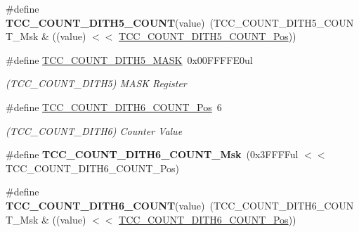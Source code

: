 \begin{DoxyCompactItemize}
\item 
\hypertarget{group___s_a_m_l21___t_c_c_gabfa5a63bca2722f40f33efadca27b212}{}\#define {\bfseries T\+C\+C\+\_\+\+C\+O\+U\+N\+T\+\_\+\+D\+I\+T\+H5\+\_\+\+C\+O\+U\+N\+T}(value)~(T\+C\+C\+\_\+\+C\+O\+U\+N\+T\+\_\+\+D\+I\+T\+H5\+\_\+\+C\+O\+U\+N\+T\+\_\+\+Msk \& ((value) $<$$<$ \hyperlink{group___s_a_m_l21___t_c_c_ga6f2bca760853e6c3d56aac5d8ec21bcf}{T\+C\+C\+\_\+\+C\+O\+U\+N\+T\+\_\+\+D\+I\+T\+H5\+\_\+\+C\+O\+U\+N\+T\+\_\+\+Pos}))\label{group___s_a_m_l21___t_c_c_gabfa5a63bca2722f40f33efadca27b212}

\item 
\hypertarget{group___s_a_m_l21___t_c_c_ga435c771c25ac37ce8dbd790ab49075b8}{}\#define \hyperlink{group___s_a_m_l21___t_c_c_ga435c771c25ac37ce8dbd790ab49075b8}{T\+C\+C\+\_\+\+C\+O\+U\+N\+T\+\_\+\+D\+I\+T\+H5\+\_\+\+M\+A\+S\+K}~0x00\+F\+F\+F\+F\+E0ul\label{group___s_a_m_l21___t_c_c_ga435c771c25ac37ce8dbd790ab49075b8}

\begin{DoxyCompactList}\small\item\em (T\+C\+C\+\_\+\+C\+O\+U\+N\+T\+\_\+\+D\+I\+T\+H5) M\+A\+S\+K Register \end{DoxyCompactList}\item 
\hypertarget{group___s_a_m_l21___t_c_c_ga0d32f27b73be7b0a3c158a18f7a6bb57}{}\#define \hyperlink{group___s_a_m_l21___t_c_c_ga0d32f27b73be7b0a3c158a18f7a6bb57}{T\+C\+C\+\_\+\+C\+O\+U\+N\+T\+\_\+\+D\+I\+T\+H6\+\_\+\+C\+O\+U\+N\+T\+\_\+\+Pos}~6\label{group___s_a_m_l21___t_c_c_ga0d32f27b73be7b0a3c158a18f7a6bb57}

\begin{DoxyCompactList}\small\item\em (T\+C\+C\+\_\+\+C\+O\+U\+N\+T\+\_\+\+D\+I\+T\+H6) Counter Value \end{DoxyCompactList}\item 
\hypertarget{group___s_a_m_l21___t_c_c_ga7d37f38e6d7a694d4b090ba3608ec681}{}\#define {\bfseries T\+C\+C\+\_\+\+C\+O\+U\+N\+T\+\_\+\+D\+I\+T\+H6\+\_\+\+C\+O\+U\+N\+T\+\_\+\+Msk}~(0x3\+F\+F\+F\+Ful $<$$<$ T\+C\+C\+\_\+\+C\+O\+U\+N\+T\+\_\+\+D\+I\+T\+H6\+\_\+\+C\+O\+U\+N\+T\+\_\+\+Pos)\label{group___s_a_m_l21___t_c_c_ga7d37f38e6d7a694d4b090ba3608ec681}

\item 
\hypertarget{group___s_a_m_l21___t_c_c_ga7d8d8fd7724900635c407c506ff5a517}{}\#define {\bfseries T\+C\+C\+\_\+\+C\+O\+U\+N\+T\+\_\+\+D\+I\+T\+H6\+\_\+\+C\+O\+U\+N\+T}(value)~(T\+C\+C\+\_\+\+C\+O\+U\+N\+T\+\_\+\+D\+I\+T\+H6\+\_\+\+C\+O\+U\+N\+T\+\_\+\+Msk \& ((value) $<$$<$ \hyperlink{group___s_a_m_l21___t_c_c_ga0d32f27b73be7b0a3c158a18f7a6bb57}{T\+C\+C\+\_\+\+C\+O\+U\+N\+T\+\_\+\+D\+I\+T\+H6\+\_\+\+C\+O\+U\+N\+T\+\_\+\+Pos}))\label{group___s_a_m_l21___t_c_c_ga7d8d8fd7724900635c407c506ff5a517}


\end{DoxyCompactItemize}
